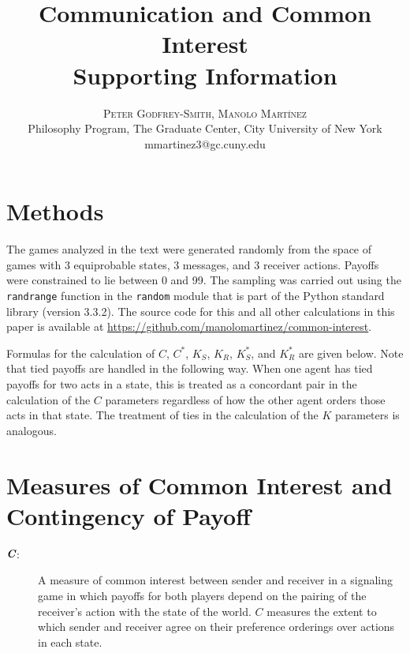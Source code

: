 \documentclass{article}
\title{Communication and Common Interest\\ \Large{Supporting Information}} %
\author{
\large
\textsc{Peter Godfrey-Smith, Manolo Mart\'inez}\\
\normalsize Philosophy Program, The Graduate Center, City University of New York\\ %
\normalsize mmartinez3@gc.cuny.edu
}
\def\mathbi#1{\textbf{\em #1}} %
\begin{document}
\maketitle %





\section*{Methods}

The games analyzed in the text were generated randomly from the
space of games with 3 equiprobable states, 3 messages, and 3
receiver actions. Payoffs were constrained to lie between 0 and 99.
The sampling was carried out using the \texttt{randrange} function in the
\texttt{random} module that is part of the Python standard library (version
3.3.2). The source code for this and all other calculations in this paper
is available at \href{https://github.com/manolomartinez/common-interest}{https://github.com/manolomartinez/common-interest}.

Formulas for the calculation of $C$, $C^*$, $K_S$, $K_R$, $K^*_S$, and $K^*_R$ are given below. Note that tied payoffs are handled in the following way.
When one agent has tied payoffs for two acts in a state, this is treated
as a concordant pair in the calculation of the $C$ parameters regardless of how the
other agent orders those acts in that state. The treatment of ties in
the calculation of the $K$ parameters is analogous.

\section*{Measures of Common Interest and Contingency of Payoff}

\begin{description}
    \item[$\mathbi{C}$:]
A measure of common interest between sender and receiver in a signaling
game in which payoffs for both players depend on the pairing of the
receiver's action with the state of the world. $C$ measures the extent to
which sender and receiver agree on their preference orderings over
actions in each state.
\end{description}
\end{document}
